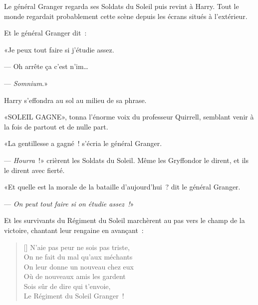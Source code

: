 Le général Granger regarda ses Soldats du Soleil puis revint à Harry. Tout le monde regardait probablement cette scène depuis les écrans situés à l'extérieur.

Et le général Granger dit~:

«Je peux tout faire si j'étudie assez.

--- Oh arrête ça c'est n'im…

--- \emph{Somnium}.»

Harry s'effondra au sol au milieu de sa phrase.

«SOLEIL GAGNE», tonna l'énorme voix du professeur Quirrell, semblant venir à la fois de partout et de nulle part.

«La gentillesse a gagné~! s'écria le général Granger.

--- \emph{Hourra}~!» crièrent les Soldats du Soleil. Même les Gryffondor le dirent, et ils le dirent avec fierté.

«Et quelle est la morale de la bataille d'aujourd'hui~? dit le général Granger.

--- \emph{On peut tout faire si on étudie assez~!}»

Et les survivants du Régiment du Soleil marchèrent au pas vers le champ de la victoire, chantant leur rengaine en avançant~:

\begin{verse}[\versewidth]
N'aie pas peur ne sois pas triste,\\
On ne fait du mal qu'aux méchants\\
On leur donne un nouveau chez eux\\
Où de nouveaux amis les gardent\\
Sois sûr de dire qui t'envoie,\\
Le Régiment du Soleil Granger~!
\end{verse}

